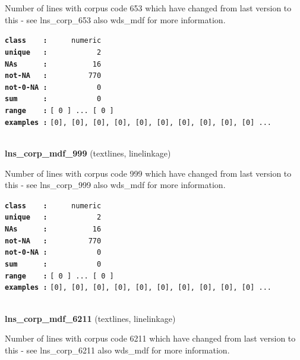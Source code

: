 \documentclass[]{article}
\begin{document}
Number of lines with corpus code 653 which have changed from last
version to this - see lns\_corp\_653 also wds\_mdf for more information.

\textbf{\texttt{class\ \ \ \ :}} \texttt{~~~~~numeric}\\
\textbf{\texttt{unique\ \ \ :}} \texttt{~~~~~~~~~~~2}\\
\textbf{\texttt{NAs\ \ \ \ \ \ :}} \texttt{~~~~~~~~~~16}\\
\textbf{\texttt{not-NA\ \ \ :}} \texttt{~~~~~~~~~770}\\
\textbf{\texttt{not-0-NA\ :}} \texttt{~~~~~~~~~~~0}\\
\textbf{\texttt{sum\ \ \ \ \ \ :}} \texttt{~~~~~~~~~~~0}\\
\textbf{\texttt{range\ \ \ \ :}}
\texttt{{[}\ 0\ {]}\ ...\ {[}\ 0\ {]}}\\
\textbf{\texttt{examples\ :}}
\texttt{{[}0{]},\ {[}0{]},\ {[}0{]},\ {[}0{]},\ {[}0{]},\ {[}0{]},\ {[}0{]},\ {[}0{]},\ {[}0{]},\ {[}0{]}\ ...}\\

~

\textbf{lns\_corp\_mdf\_999} (textlines, linelinkage)

Number of lines with corpus code 999 which have changed from last
version to this - see lns\_corp\_999 also wds\_mdf for more information.

\textbf{\texttt{class\ \ \ \ :}} \texttt{~~~~~numeric}\\
\textbf{\texttt{unique\ \ \ :}} \texttt{~~~~~~~~~~~2}\\
\textbf{\texttt{NAs\ \ \ \ \ \ :}} \texttt{~~~~~~~~~~16}\\
\textbf{\texttt{not-NA\ \ \ :}} \texttt{~~~~~~~~~770}\\
\textbf{\texttt{not-0-NA\ :}} \texttt{~~~~~~~~~~~0}\\
\textbf{\texttt{sum\ \ \ \ \ \ :}} \texttt{~~~~~~~~~~~0}\\
\textbf{\texttt{range\ \ \ \ :}}
\texttt{{[}\ 0\ {]}\ ...\ {[}\ 0\ {]}}\\
\textbf{\texttt{examples\ :}}
\texttt{{[}0{]},\ {[}0{]},\ {[}0{]},\ {[}0{]},\ {[}0{]},\ {[}0{]},\ {[}0{]},\ {[}0{]},\ {[}0{]},\ {[}0{]}\ ...}\\

~

\textbf{lns\_corp\_mdf\_6211} (textlines, linelinkage)

Number of lines with corpus code 6211 which have changed from last
version to this - see lns\_corp\_6211 also wds\_mdf for more
information.
\end{document}
